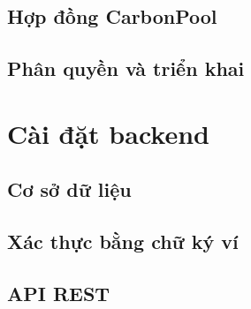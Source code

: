 \subsection{Hợp đồng CarbonPool}
\label{subsec:caidat-pool}

\subsection{Phân quyền và triển khai}
\label{subsec:phanquyen}

\section{Cài đặt backend}
\label{sec:caidat-backend}

\subsection{Cơ sở dữ liệu}
\label{subsec:caidat-csdl}

\subsection{Xác thực bằng chữ ký ví}
\label{subsec:xacthuc}

\subsection{API REST}
\label{subsec:caidat-api}

